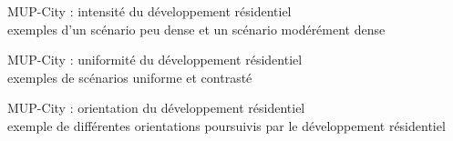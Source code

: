 \documentclass[xcolor=table]{beamer}
\begin{document}
\begin{frame}{MUP-City : intensité du développement résidentiel}
\vspace{1cm}
\\
{\footnotesize exemples d'un scénario peu dense et un scénario modérément dense}
\end{frame}


\begin{frame}{MUP-City : uniformité du développement résidentiel}
\vspace{1cm}
\\
{\footnotesize exemples de scénarios uniforme et contrasté}
\end{frame}


\begin{frame}{MUP-City : orientation du développement résidentiel}
\vspace{1cm}
\\
{\footnotesize exemple de différentes orientations poursuivis par le développement résidentiel}
\end{frame}
\end{document}
